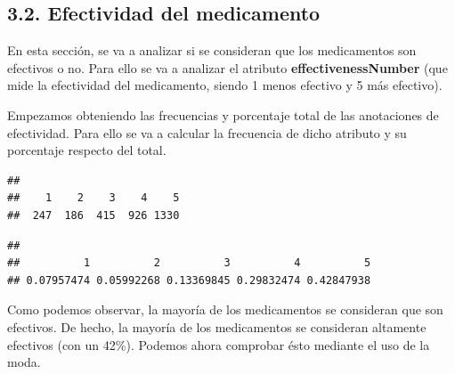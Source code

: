 \documentclass[spanish,]{article}
\newenvironment{Shaded}{\begin{snugshade}}{\end{snugshade}}
\newcommand{\KeywordTok}[1]{\textcolor[rgb]{0.13,0.29,0.53}{\textbf{#1}}}
\newcommand{\DecValTok}[1]{\textcolor[rgb]{0.00,0.00,0.81}{#1}}
\newcommand{\StringTok}[1]{\textcolor[rgb]{0.31,0.60,0.02}{#1}}
\newcommand{\CommentTok}[1]{\textcolor[rgb]{0.56,0.35,0.01}{\textit{#1}}}
\newcommand{\OperatorTok}[1]{\textcolor[rgb]{0.81,0.36,0.00}{\textbf{#1}}}
\newcommand{\NormalTok}[1]{#1}
\begin{document}
\subsection{3.2. Efectividad del
medicamento}\label{efectividad-del-medicamento}

En esta sección, se va a analizar si se consideran que los medicamentos
son efectivos o no. Para ello se va a analizar el atributo
\textbf{effectivenessNumber} (que mide la efectividad del medicamento,
siendo 1 menos efectivo y 5 más efectivo).

Empezamos obteniendo las frecuencias y porcentaje total de las
anotaciones de efectividad. Para ello se va a calcular la frecuencia de
dicho atributo y su porcentaje respecto del total.

\begin{Shaded}
\end{Shaded}

\begin{verbatim}
## 
##    1    2    3    4    5 
##  247  186  415  926 1330
\end{verbatim}

\begin{Shaded}
\end{Shaded}

\begin{verbatim}
## 
##          1          2          3          4          5 
## 0.07957474 0.05992268 0.13369845 0.29832474 0.42847938
\end{verbatim}

Como podemos observar, la mayoría de los medicamentos se consideran que
son efectivos. De hecho, la mayoría de los medicamentos se consideran
altamente efectivos (con un 42\%). Podemos ahora comprobar ésto mediante
el uso de la moda.
\end{document}
